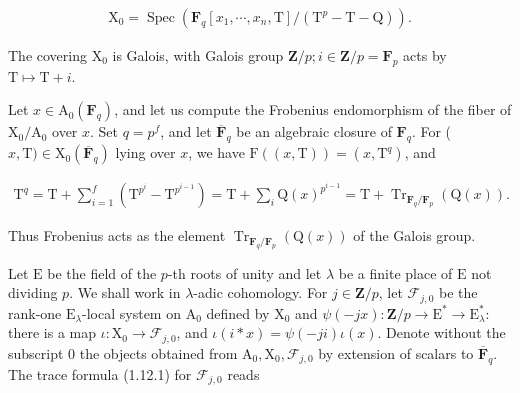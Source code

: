 \documentclass[10pt,leqno]{article}
\begin{document}
\begin{equation*}\begin{gathered}\mathrm{X}_{0} = \operatorname{Spec}(\mathbf{F}_{q}[x_{1},\cdots ,x_{n},\mathrm{T}]/(\mathrm{T}^{p}-\mathrm{T}-\mathrm{Q})).\end{gathered}\end{equation*}

\noindent The covering \(\mathrm{X}_{0}\) is Galois, with Galois group \(\mathbf{Z}/p; i \in  \mathbf{Z}/p = \mathbf{F}_{p}\) acts by \(\mathrm{T} \longmapsto  \mathrm{T}+i\).\par

\noindent Let \(x \in  \mathrm{A}_{0}(\mathbf{F}_{q})\), and let us compute the Frobenius endomorphism of the fiber of \(\mathrm{X}_{0}/\mathrm{A}_{0}\) over \(x\). Set \(q = p^{f}\), and let \(\overline{\mathbf{F}}_{q}\) be an algebraic closure of \(\mathbf{F}_{q}\). For (\(x,\mathrm{T}) \in  \mathrm{X}_{0}(\overline{\mathbf{F}}_{q})\) lying over \(x\), we have \(\mathrm{F}((x,\mathrm{T})) = (x,\mathrm{T}^{q})\), and\par

\begin{equation*}\begin{gathered}\mathrm{T}^{q} = \mathrm{T} + \sum _{i=1}^{f} (\mathrm{T}^{p^{i}}-\mathrm{T}^{p^{i-1}}) = \mathrm{T} + \sum _{i} \mathrm{Q}(x)^{p^{i-1}} = \mathrm{T} + \operatorname{Tr}_{\mathbf{F}_{q}/\mathbf{F}_{p}}(\mathrm{Q}(x)).\end{gathered}\end{equation*}

\noindent Thus Frobenius acts as the element \(\operatorname{Tr}_{\mathbf{F}_{q}/\mathbf{F}_{p}}(\mathrm{Q}(x))\) of the Galois group.\par

\noindent Let \(\mathrm{E}\) be the field of the \(p\)-th roots of unity and let \(\lambda \) be a finite place of \(\mathrm{E}\) not dividing \(p\). We shall work in \(\lambda \)-adic cohomology. For \(j \in  \mathbf{Z}/p\), let \(\mathcal{F} _{j,0}\) be the rank-one \(\mathrm{E}_{\lambda }\)-local system on \(\mathrm{A}_{0}\) defined by \(\mathrm{X}_{0}\) and \(\psi (-jx) : \mathbf{Z}/p \longrightarrow  \mathrm{E}^{*} \longrightarrow  \mathrm{E}_{\lambda }^{*}\): there is a map \(\iota  : \mathrm{X}_{0} \longrightarrow  \mathcal{F} _{j,0}\), and \(\iota (i*x) = \psi (-ji)\iota (x)\). Denote without the subscript 0 the objects obtained from \(\mathrm{A}_{0}, \mathrm{X}_{0}, \mathcal{F} _{j,0}\) by extension of scalars to \(\overline{\mathbf{F}}_{q}\). The trace formula (1.12.1) for \(\mathcal{F} _{j,0}\) reads\par
\end{document}
